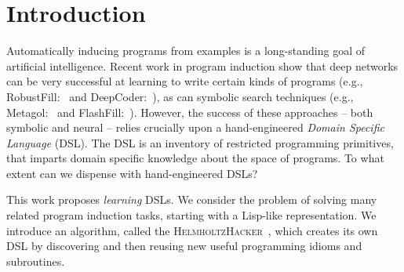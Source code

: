 \documentclass{article}
\newcommand{\system}{\textsc{HelmholtzHacker}~}
\begin{document}
\printAffiliationsAndNotice{\icmlEqualContribution} %

\begin{abstract}

\end{abstract}

\section{Introduction}

Automatically inducing programs from examples is a long-standing goal
of artificial intelligence.  Recent work in program induction show
that deep networks can be very successful at learning to write certain
kinds of programs (e.g., RobustFill:~\cite{devlin2017robustfill} and
DeepCoder:~\cite{balog2016deepcoder}), as can symbolic search
techniques (e.g., Metagol:~\cite{muggleton2015meta} and 
FlashFill:~\cite{gulwani2011automating}).
However, the success of these approaches -- both symbolic and neural --
relies crucially upon a hand-engineered \emph{Domain Specific Language} (DSL).
The DSL is an inventory of restricted programming primitives,
that imparts domain specific knowledge about the space of programs.
To what extent can we dispense with hand-engineered DSLs?

This work proposes \emph{learning} DSLs.
We consider the problem of solving many related program induction tasks,
starting with a Lisp-like representation.
We introduce an algorithm, called the \system,
which creates its own DSL by discovering and then reusing
new useful programming idioms and subroutines.





\end{document}
